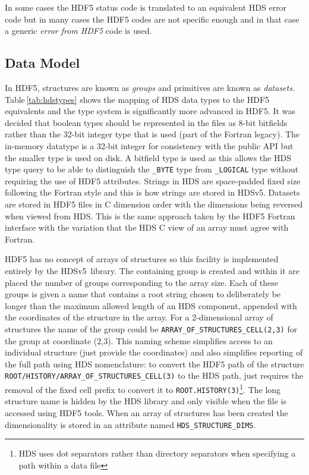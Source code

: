 \documentclass[final,authoryear,5p,times,twocolumn]{elsarticle}
\newcommand{\new}{HDSv5}
\begin{document}
In some cases the HDF5 status code is translated to an equivalent HDS
error code but in many cases the HDF5 codes are not specific enough
and in that case a generic \emph{error from HDF5} code is used.

\subsection{Data Model}

In HDF5, structures are known as \emph{groups} and primitives are
known as \emph{datasets}. Table\,\ref{tab:hdstypes} shows the mapping
of HDS data types to the HDF5 equivalents and the type system is
significantly more advanced in HDF5. It was decided that boolean types
should be represented in the files as 8-bit bitfields rather than the
32-bit integer type that is used (part of the Fortran legacy). The
in-memory datatype is a 32-bit integer for consistency with the public
API but the smaller type is used on disk. A bitfield type is used as
this allows the HDS type query to be able to distinguish the
\texttt{\_BYTE} type from \texttt{\_LOGICAL} type without requiring
the use of HDF5 attributes. Strings in HDS are space-padded fixed size
following the Fortran style and this is how strings are stored in
\new. Datasets are stored in HDF5 files in C dimension order with the
dimensions being reversed when viewed from HDS. This is the same
approach taken by the HDF5 Fortran interface with the variation that
the HDS C view of an array must agree with Fortran.

HDF5 has no concept of arrays of structures so this facility is
implemented entirely by the \new\ library. The containing group is
created and within it are placed the number of groups corresponding to
the array size. Each of these groups is given a name that contains a
root string chosen to deliberately be longer than the maximum allowed
length of an HDS component, appended with the coordinates of the
structure in the array. For a 2-dimensional array of structures the
name of the group could be \texttt{ARRAY\_OF\_STRUCTURES\_CELL(2,3)}
for the group at coordinate (2,3). This naming scheme simplifies
access to an individual structure (just provide the coordinates) and
also simplifies reporting of the full path using HDS nomenclature: to
convert the HDF5 path of the structure
\texttt{ROOT/HISTORY/ARRAY\_OF\_STRUCTURES\_CELL(3)} to the HDS path,
just requires the removal of the fixed cell prefix to convert it to
\texttt{ROOT.HISTORY(3)}\footnote{HDS uses dot separators rather than
  directory separators when specifying a path within a data file}. The
long structure name is hidden by the HDS library and only visible when
the file is accessed using HDF5 tools. When an array of structures has
been created the dimensionality is stored in an attribute named
\texttt{HDS\_STRUCTURE\_DIMS}.
\end{document}
